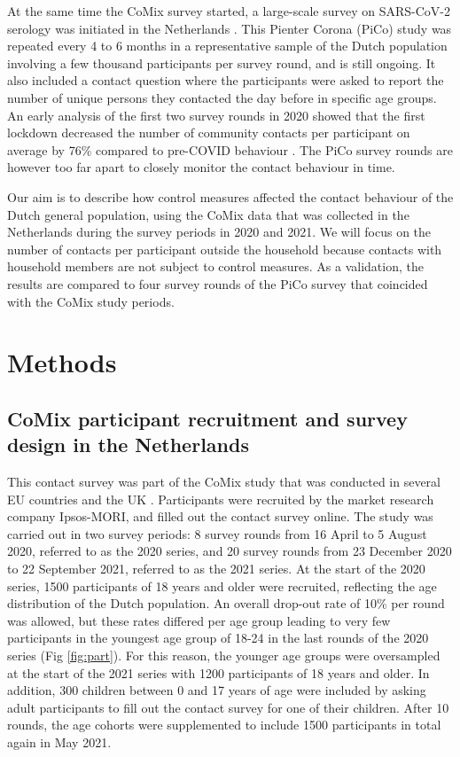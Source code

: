 \documentclass[fleqn,10pt]{wlscirep}
\begin{document}
At the same time the CoMix survey started, a large-scale survey on SARS-CoV-2 serology was initiated in the Netherlands \cite{Vos_2021}. This Pienter Corona (PiCo) study was repeated every 4 to 6 months in a representative sample of the Dutch population involving a few thousand participants per survey round, and is still ongoing. It also included a contact question where the participants were asked to report the number of unique persons they contacted the day before in specific age groups. An early analysis of the first two survey rounds in 2020 showed that the first lockdown decreased the number of community contacts per participant on average by 76\% compared to pre-COVID behaviour \cite{Backer_2021}. The PiCo survey rounds are however too far apart to closely monitor the contact behaviour in time.

Our aim is to describe how control measures affected the contact behaviour of the Dutch general population, using the CoMix data that was collected in the Netherlands during the survey periods in 2020 and 2021. We will focus on the number of contacts per participant outside the household because contacts with household members are not subject to control measures. As a validation, the results are compared to four survey rounds of the PiCo survey that coincided with the CoMix study periods.


\section*{Methods}

\subsection*{CoMix participant recruitment and survey design in the Netherlands}

This contact survey was part of the CoMix study that was conducted in several EU countries and the UK \cite{Verelst_2021}. Participants were recruited by the market research company Ipsos-MORI, and filled out the contact survey online. The study was carried out in two survey periods: 8 survey rounds from 16 April to 5 August 2020, referred to as the 2020 series, and 20 survey rounds from 23 December 2020 to 22 September 2021, referred to as the 2021 series. At the start of the 2020 series, 1500 participants of 18 years and older were recruited, reflecting the age distribution of the Dutch population. An overall drop-out rate of 10\% per round was allowed, but these rates differed per age group leading to very few participants in the youngest age group of 18-24 in the last rounds of the 2020 series (Fig \ref{fig:part}). For this reason, the younger age groups were oversampled at the start of the 2021 series with 1200 participants of 18 years and older. In addition, 300 children between 0 and 17 years of age were included by asking adult participants to fill out the contact survey for one of their children. After 10 rounds, the age cohorts were supplemented to include 1500 participants in total again in May 2021.
\end{document}
